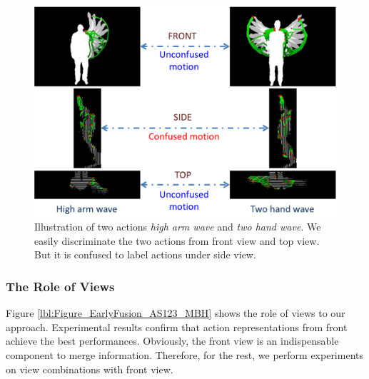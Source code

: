 \documentclass[final,3p,times,twocolumn]{elsarticle}
\begin{document}

\begin{figure}[h]
	\centering
	\includegraphics[width=\columnwidth]{Figures/Figure_TheRoleOfViews.pdf}
	\caption{Illustration of two actions \textit{high arm wave} and \textit{two hand wave}. We easily discriminate the two actions from front view and top view. But it is confused to label actions under side view.}
	\label{Figure_TheRoleOfViews}
\end{figure}

\subsubsection{The Role of Views}

Figure \ref{lbl:Figure_EarlyFusion_AS123_MBH} shows the role of views to our approach.
Experimental results confirm that action representations from front achieve the best performances. Obviously, the front view is an indispensable component to merge information.
Therefore, for the rest, we perform experiments on view combinations with front view.
\end{document}
